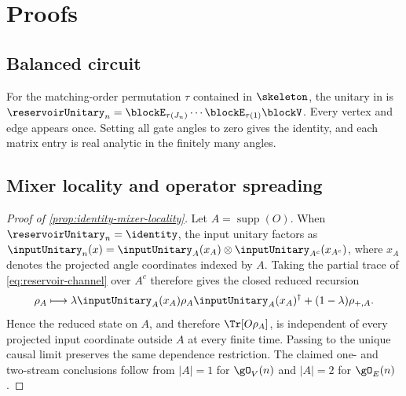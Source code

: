 \section{Proofs}
\label{app:proofs}

\subsection{Balanced circuit}
\label{app:balanced-circuit}

For the matching-order permutation $\tau$ contained in $\skeleton$, the
unitary in  is
$\reservoirUnitary_n=\blockE_{\tau(J_n)}\cdots\blockE_{\tau(1)}\blockV$.
Every vertex and edge appears once.  Setting all gate angles to zero gives the
identity, and each matrix entry is real analytic in the finitely many angles.

\subsection{Mixer locality and operator spreading}
\label{app:mixer-spreading-proofs}

\begin{proof}[Proof of \cref{prop:identity-mixer-locality}]
Let $A=\operatorname{supp}(O)$.  When
$\reservoirUnitary_n=\identity$, the input unitary factors as
$\inputUnitary_n(x)=\inputUnitary_A(x_A)\otimes
\inputUnitary_{A^c}(x_{A^c})$, where $x_A$ denotes the projected angle
coordinates indexed by $A$.  Taking the partial trace of
\cref{eq:reservoir-channel} over $A^c$ therefore gives the closed reduced
recursion
\[
    \rho_A\longmapsto
    \lambda\inputUnitary_A(x_A)\rho_A\inputUnitary_A(x_A)^\dagger
    +(1-\lambda)\rho_{+,A}.
\]
Hence the reduced state on $A$, and therefore $\Tr[O\rho_A]$, is independent
of every projected input coordinate outside $A$ at every finite time.  Passing
to the unique causal limit preserves the same dependence restriction.  The
claimed one- and two-stream conclusions follow from
$|A|=1$ for $\gO_V(n)$ and $|A|=2$ for $\gO_E(n)$.
\end{proof}

